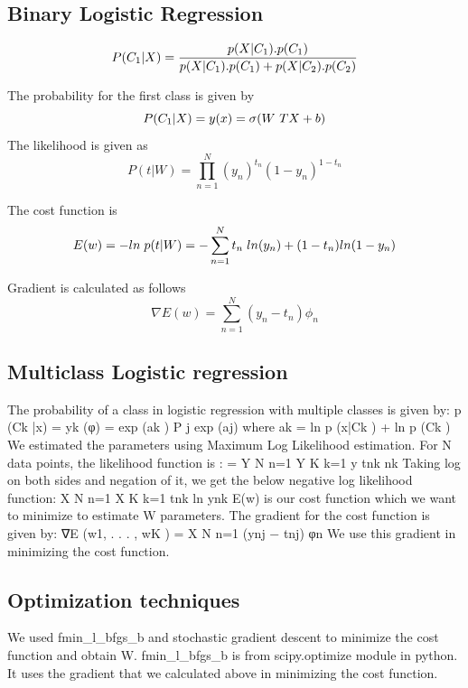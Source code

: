 \documentclass{article}
\begin{document}
\subsection{Binary Logistic Regression}
\begin{equation}
P(C_{1}|X) = \vspace{10mm}   \frac{p(X|C_{1}).p(C_{1})}{p(X|C_{1}).p(C_{1}) + p(X|C_{2}).p(C_{2})}
\end{equation}

The probability for the first class is given by 
\begin{equation}
P(C_{1}|X) = y(x)  = \sigma(W\textsuperscript{T}X + b) 
\end{equation}
The likelihood is given as 
\begin{equation}
P(t|W) = \prod\limits_{n=1}^N (y_{n})^{t_{n}}(1-y_{n})^{1- t_{n}}
\end{equation}

The cost function is 
\begin{equation}
E(w) = -ln \hspace{1mm} p(t|W) = -\sum\limits_{n=1}^N t_{n}\hspace{1mm}ln(y_{n}) + (1-t_{n})ln(1-y_{n})
\end{equation}

Gradient is calculated as follows
\begin{equation}
\nabla E(w) = \sum\limits_{n=1}^N (y_{n} - t_{n}) \phi_{n}
\end{equation}



\subsection{Multiclass Logistic regression}
The probability of a class in logistic regression with multiple classes is given by:
p (Ck |x) = yk (φ) = exp (ak ) P j exp (aj) where ak = ln p (x|Ck ) + ln p (Ck )
We estimated the parameters using Maximum Log Likelihood estimation. For N data points, the likelihood function is : 
= Y N n=1 Y K k=1 y tnk nk
Taking log on both sides and negation of it, we get the below negative log likelihood function:
X N n=1 X K k=1 tnk ln ynk
E(w) is our cost function which we want to minimize to estimate W parameters. The gradient for the cost function is given by:
∇E (w1, . . . , wK ) = X N n=1 (ynj − tnj) φn
We use this gradient in minimizing the cost function.

\subsection{Optimization techniques}
We used fmin\_l\_bfgs\_b and stochastic gradient descent to minimize the cost function and obtain W. fmin\_l\_bfgs\_b is from scipy.optimize module in python. It uses the gradient that we calculated above in minimizing the cost function.
\end{document}
